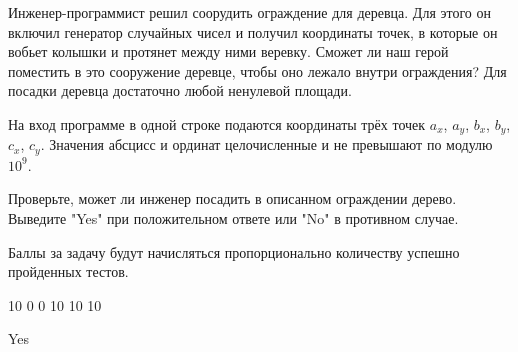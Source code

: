 
Инженер-программист решил соорудить ограждение для деревца. Для этого он включил генератор случайных чисел и получил координаты точек, в которые он вобьет колышки и протянет между ними веревку. Сможет ли наш герой поместить в это сооружение деревце, чтобы оно лежало внутри ограждения? Для посадки деревца достаточно любой ненулевой площади.

На вход программе в одной строке подаются координаты трёх точек $a_x$, $a_y$, $b_x$, $b_y$, $c_x$, $c_y$. 
Значения абсцисс и ординат целочисленные и не превышают по модулю $10^9$. 

\outputfmtSection
Проверьте, может ли инженер посадить в описанном ограждении дерево. Выведите "Yes" при положительном ответе или "No" в противном случае.

\markSection

Баллы за задачу будут начисляться пропорционально количеству успешно пройденных тестов.




\begin{myverbbox}[\small]{\vinput}
    10 0 0 10 10 10
\end{myverbbox}

\begin{myverbbox}[\small]{\voutput}
    Yes
\end{myverbbox}

